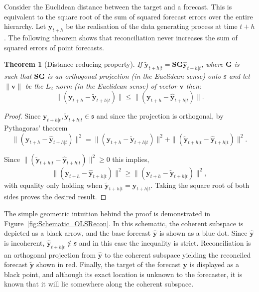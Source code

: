 \documentclass[12pt]{article}
\newtheorem{theo}{Theorem}[section]
\theoremstyle{definition}
\begin{document}
Consider the Euclidean distance between the target and a forecast. This is equivalent to the square root of the sum of squared forecast errors over the entire hierarchy. Let $\bm{y}_{t+h}$ be the realisation of the data generating process at time $t+h$. The following theorem shows that reconciliation never increases the sum of squared errors of point forecasts.

\begin{theo}[Distance reducing property]\label{th:distred}
  If $\tilde{\bm{y}}_{t+h|t}=\bm{S}\bm{G}\hat{\bm{y}}_{t+h|t}$, where $\bm{G}$ is such that $\bm{S}\bm{G}$ is an orthogonal projection (in the Euclidean sense) onto $\mathfrak{s}$ and let $\|\bm{v}\|$ be the $L_2$ norm (in the Euclidean sense) of vector $\bm{v}$ then:
  \begin{equation*}
    \|(\bm{y}_{t+h}-\tilde{\bm{y}}_{t+h|t})\|\le\|(\bm{y}_{t+h}-\hat{\bm{y}}_{t+h|t})\|.
  \end{equation*}
\end{theo}
\begin{proof}
  Since $\bm{y}_{t+h|t},\tilde{\bm{y}}_{t+h|t}\in\mathfrak{s}$ and since the projection is orthogonal, by Pythagoras' theorem
  \begin{equation*} \|(\bm{y}_{t+h}-\hat{\bm{y}}_{t+h|t})\|^2=\|(\bm{y}_{t+h}-\tilde{\bm{y}}_{t+h|t})\|^2+\|(\tilde{\bm{y}}_{t+h|t}-\hat{\bm{y}}_{t+h|t})\|^2.
  \end{equation*}

  Since $\|(\tilde{\bm{y}}_{t+h|t}-\hat{\bm{y}}_{t+h|t})\|^2\ge 0$ this implies,
  \begin{equation*} \|(\bm{y}_{t+h}-\hat{\bm{y}}_{t+h|t})\|^2\ge\|(\bm{y}_{t+h}-\tilde{\bm{y}}_{t+h|t})\|^2,
  \end{equation*}
  with equality only holding when $\tilde{\bm{y}}_{t+h|t}=\hat{\bm{y}}_{t+h|t}$. Taking the square root of both sides proves the desired result.
\end{proof}

The simple geometric intuition behind the proof is demonstrated in Figure~\ref{fig:Schematic_OLSRecon}. In this schematic, the coherent subspace is depicted as a black arrow, and the base forecast $\hat{\bm{y}}$ is shown as a blue dot. Since $\hat{\bm{y}}$ is incoherent, $\hat{\bm{y}}_{t+h|t}\notin\mathfrak{s}$ and in this case the inequality is strict. Reconciliation is an orthogonal projection from $\hat{\bm{y}}$ to the coherent subspace yielding the reconciled forecast $\tilde{\bm{y}}$ shown in red. Finally, the target of the forecast $\bm{y}$ is displayed as a black point, and although its exact location is unknown to the forecaster, it is known that it will lie somewhere along the coherent subspace.
\end{document}
